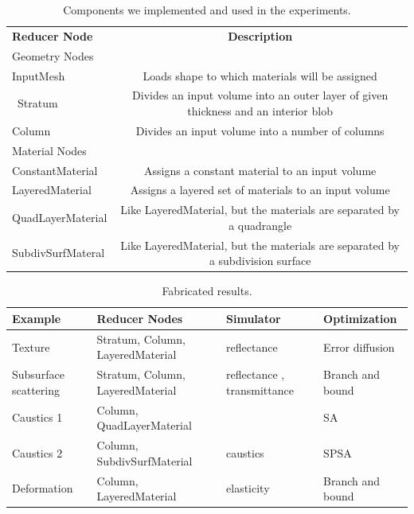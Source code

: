 \documentclass[annual]{acmsiggraph}
\begin{document}
\begin{table}
\centering
\begin{tabular}{lc}
\hline 
\textbf{Reducer Node} & \textbf{Description} \\
Geometry Nodes &\\
\hline
InputMesh & Loads shape to which materials will be assigned\\\
Stratum & Divides an input volume into an outer layer of given thickness and an interior blob\\
Column & Divides an input volume into a number of columns\\
\hline
Material Nodes &\\
\hline
ConstantMaterial & Assigns a constant material to an input volume \\
LayeredMaterial &  Assigns a layered set of materials to an input volume \\
QuadLayerMaterial & Like LayeredMaterial, but the materials are separated by a quadrangle\\
SubdivSurfMateral & Like LayeredMaterial, but the materials are separated by a subdivision surface \\
\hline
\end{tabular}
\caption{Components we implemented and used in the experiments.}
\label{tab:built-in}
\end{table}

\begin{table}
\centering
\begin{tabular}{llll}  %
\hline 
\textbf{Example} & \textbf{Reducer Nodes} & \textbf{Simulator} & \textbf{Optimization}\\
\hline 
Texture& Stratum, Column, LayeredMaterial & reflectance & Error diffusion \\
Subsurface scattering& Stratum, Column, LayeredMaterial & reflectance , transmittance & Branch and bound\\
Caustics 1 & Column, QuadLayerMaterial & & SA \\
Caustics 2 & Column, SubdivSurfMaterial & caustics & SPSA \\
Deformation & Column, LayeredMaterial& elasticity & Branch and bound\\
\hline
\end{tabular}
\caption{Fabricated results.}
\label{tab:example}
\end{table}
\end{document}
